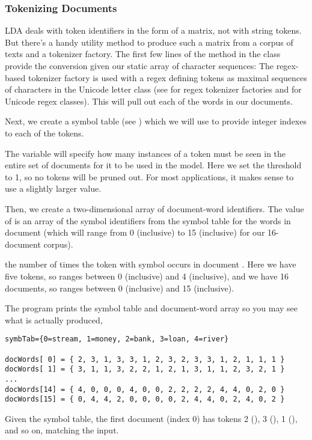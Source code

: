\subsubsection{Tokenizing Documents}

LDA deals with token identifiers in the form of a matrix, not
with string tokens.  But there's a handy utility method to produce
such a matrix from a corpus of texts and a tokenizer factory.
The first few lines of the  method in
the  class provide the conversion
given our static array  of character sequences:
%
%
The regex-based tokenizer factory is used with a regex defining tokens
as maximal sequences of characters in the Unicode letter class (see
 for regex tokenizer factories and
 for Unicode regex classes).  This will
pull out each of the words in our documents.  

Next, we create a symbol table (see )
which we will use to provide integer indexes to each of the tokens.

The variable  will specify how many instances of a
token must be seen in the entire set of documents for it to be used in
the model.  Here we set the threshold to 1, so no tokens will be
pruned out.  For most applications, it makes sense to use a slightly
larger value.

Then, we create a two-dimensional array of document-word identifiers.
The value of  is an array of the symbol identifiers
from the symbol table for the words in document  (which will
range from 0 (inclusive) to 15 (inclusive) for our 16-document
corpus).

the number of times the token with
symbol  occurs in document .  Here we have five
tokens, so  ranges between 0 (inclusive) and 4 (inclusive),
and we have 16 documents, so  ranges between 0 (inclusive) and
15 (inclusive).

The program prints the symbol table and document-word array so
you may see what is actually produced,
%
\begin{verbatim}
symbTab={0=stream, 1=money, 2=bank, 3=loan, 4=river}

docWords[ 0] = { 2, 3, 1, 3, 3, 1, 2, 3, 2, 3, 3, 1, 2, 1, 1, 1 }
docWords[ 1] = { 3, 1, 1, 3, 2, 2, 1, 2, 1, 3, 1, 1, 2, 3, 2, 1 }
...
docWords[14] = { 4, 0, 0, 0, 4, 0, 0, 2, 2, 2, 2, 4, 4, 0, 2, 0 }
docWords[15] = { 0, 4, 4, 2, 0, 0, 0, 0, 2, 4, 4, 0, 2, 4, 0, 2 }
\end{verbatim}
%
Given the symbol table, the first document (index 0) has tokens 2
(), 3 (), 1
(), and so on, matching the input.  

